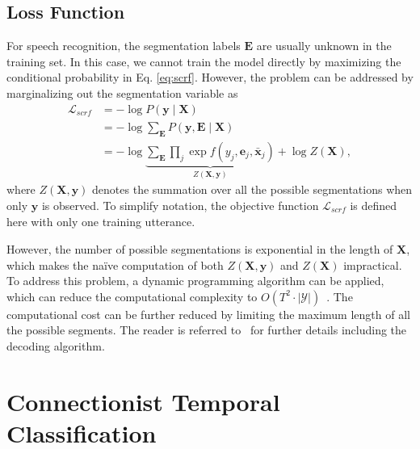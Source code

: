 \documentclass[a4paper]{article}
\begin{document}
\subsection{Loss Function}
\label{sec:hidden_loss}

For speech recognition, the segmentation labels ${\bm E}$ are usually unknown in the training set. In this case, we cannot train the model directly by maximizing the conditional probability in Eq. \eqref{eq:scrf}. However, the problem can be addressed by marginalizing out the segmentation variable as
\begin{align}
\mathcal{L}_{\mathit{scrf}} &= - \log P({\bm y} \mid {\bm X}) \nonumber \\
 &= - \log \sum_{{\bm E}} P({\bm y, \bm E} \mid {\bm X}) \nonumber \\
&= - \log \underbrace{\sum_{{\bm E}} \prod_j \exp f \left( y_j, {\bm e}_j, \bar{\bm x}_j \right)}_{ Z({\bm X}, \mathbf{y})} + \log Z({\bm X}),
\end{align}
where $Z({\bm X}, {\bm y})$ denotes the summation over all the possible segmentations when only ${\bm y}$ is observed. To simplify notation, the objective function $\mathcal{L}_{\mathit{scrf}}$ is defined here with only one training utterance. 

However, the number of possible segmentations is exponential in the length of ${\bm X}$, which makes the na\"{i}ve computation of both $Z({\bm X}, {\bm y})$ and $Z({\bm X})$ impractical. To address this problem, a dynamic programming algorithm can be applied, which can reduce the computational complexity to $O(T^2\cdot |\mathcal{Y}|)$~\cite{sarawagi2004semi}. The computational cost can be further reduced by limiting the maximum length of all the possible segments. The reader is referred to~\cite{lu2016segmental} for further details including the decoding algorithm. 


\section{Connectionist Temporal Classification }
\end{document}
